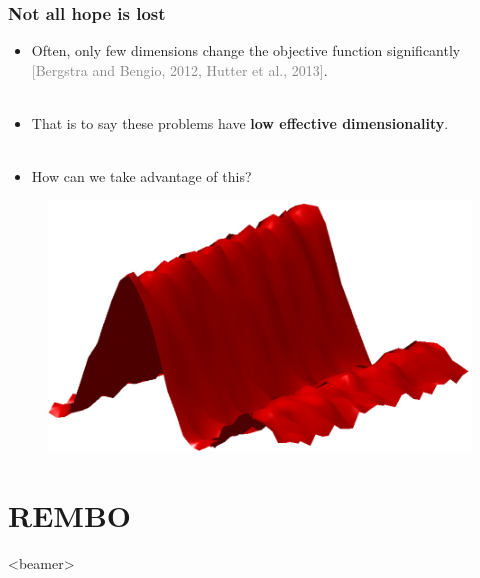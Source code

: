 \documentclass[grey]{beamer}
\begin{document}
   
 \begin{frame}
   \frametitle{Not all hope is lost}
    \begin{minipage}[l]{0.63\columnwidth}
     \begin{itemize}
      \item Often, only few dimensions change the objective function significantly
       \textcolor{gray}{[Bergstra and Bengio, 2012, Hutter et al., 2013]}.\\~\\
      \item That is to say these problems have 
       {\bf \textcolor{myColor}{low effective dimensionality}}.\\~\\
       \item How can we take advantage of this?
     \end{itemize}

    \end{minipage}
    \begin{minipage}[r]{0.35\columnwidth}
     \begin{figure}[t]
      \includegraphics[width = 1.0\columnwidth]
      {./figs/2to1embedding.pdf}
      \label{fig:ESSL_BLR}
     \end{figure}
    \end{minipage}
  \end{frame}

  
\section{REMBO}
 \begin{frame}<beamer>
  \tableofcontents[currentsection]
 \end{frame}
\end{document}
